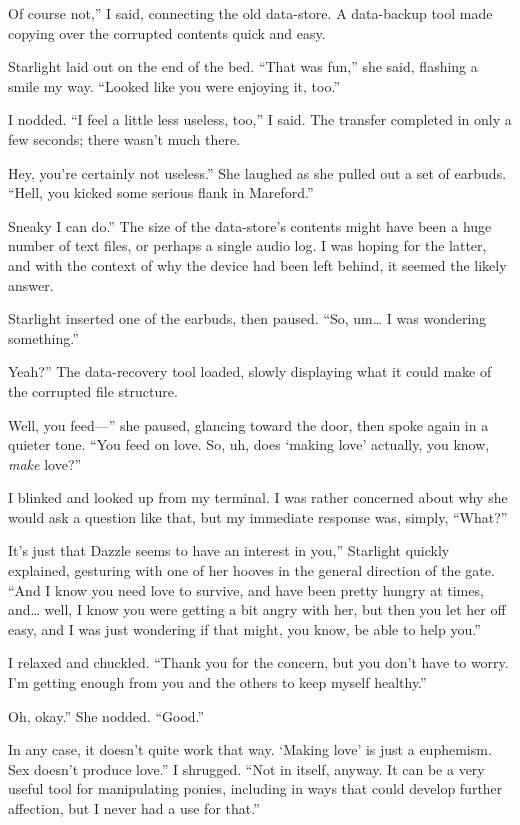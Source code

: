 \leavevmode{}Of course not,” I said, connecting the old data-store. A data-backup tool made copying over the corrupted contents quick and easy.

Starlight laid out on the end of the bed. “That was fun,” she said, flashing a smile my way. “Looked like you were enjoying it, too.”

I nodded. “I feel a little less useless, too,” I said. The transfer completed in only a few seconds; there wasn’t much there.

\leavevmode{}Hey, you’re certainly not useless.” She laughed as she pulled out a set of earbuds. “Hell, you kicked some serious flank in Mareford.”

\leavevmode{}Sneaky I can do.” The size of the data-store’s contents might have been a huge number of text files, or perhaps a single audio log. I was hoping for the latter, and with the context of why the device had been left behind, it seemed the likely answer.

Starlight inserted one of the earbuds, then paused. “So, um… I was wondering something.”

\leavevmode{}Yeah?” The data-recovery tool loaded, slowly displaying what it could make of the corrupted file structure.

\leavevmode{}Well, you feed—” she paused, glancing toward the door, then spoke again in a quieter tone. “You feed on love. So, uh, does ‘making love’ actually, you know, \textit{make} love?”

I blinked and looked up from my terminal. I was rather concerned about why she would ask a question like that, but my immediate response was, simply, “What?”

\leavevmode{}It’s just that Dazzle seems to have an interest in you,” Starlight quickly explained, gesturing with one of her hooves in the general direction of the gate. “And I know you need love to survive, and have been pretty hungry at times, and… well, I know you were getting a bit angry with her, but then you let her off easy, and I was just wondering if that might, you know, be able to help you.”

I relaxed and chuckled. “Thank you for the concern, but you don’t have to worry. I’m getting enough from you and the others to keep myself healthy.”

\leavevmode{}Oh, okay.” She nodded. “Good.”

\leavevmode{}In any case, it doesn’t quite work that way. ‘Making love’ is just a euphemism. Sex doesn’t produce love.” I shrugged. “Not in itself, anyway. It can be a very useful tool for manipulating ponies, including in ways that could develop further affection, but I never had a use for that.”

